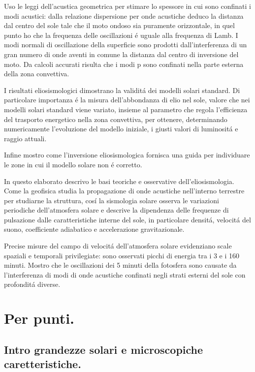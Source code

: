 \documentclass[oneside,12pt,fleqn]{memoir}
\begin{document}
Uso le leggi dell'acustica geometrica per stimare lo spessore in cui sono confinati i modi acustici: dalla relazione dispersione per onde acustiche deduco la distanza dal centro del sole tale che il moto ondoso sia puramente orizzontale, in quel punto ho che la frequenza delle oscillazioni \'e uguale alla frequenza di Lamb. I modi normali di oscillazione della superficie sono prodotti dall'interferenza di un gran numero di onde aventi in comune la distanza dal centro di inversione del moto. Da calcoli accurati risulta che i modi p sono confinati nella parte esterna della zona convettiva. 

I risultati eliosismologici dimostrano la validit\'a dei modelli solari standard. Di particolare importanza \'e la  misura  dell'abbondanza di elio nel sole, valore che nei modelli solari standard viene variato, insieme al parametro che regola l'efficienza del trasporto energetico nella zona convettiva, per ottenere, determinando numericamente l'evoluzione del modello iniziale, i giusti valori di luminosit\'a e raggio attuali.

Infine mostro come l'inversione eliosismologica fornisca una guida per individuare le zone in cui il modello solare non \'e corretto.



In questo elaborato descrivo le basi teoriche e osservative dell'eliosismologia. Come la geofisica studia la propagazione di onde acustiche nell'interno terrestre per studiarne la struttura, cos\'i la sismologia solare osserva le variazioni periodiche dell'atmosfera solare e descrive la dipendenza delle frequenze di pulsazione dalle caratteristiche interne del sole, in particolare densit\'a, velocit\'a del suono, coefficiente adiabatico e accelerazione gravitazionale. 



Precise misure del campo di velocit\'a dell'atmosfera solare evidenziano scale spaziali e temporali privilegiate: sono osservati picchi di energia tra i 3 e i 160 minuti. Mostro che le oscillazioni dei 5 minuti della fotosfera sono causate da l'interferenza di modi di onde acustiche confinati negli strati esterni del sole con profondit\'a diverse.

\printbibliography[heading=subbibintoc]


\chapter{Per punti.}
\PartialToc


\section{Intro grandezze solari e microscopiche caretteristiche.}
\end{document}
